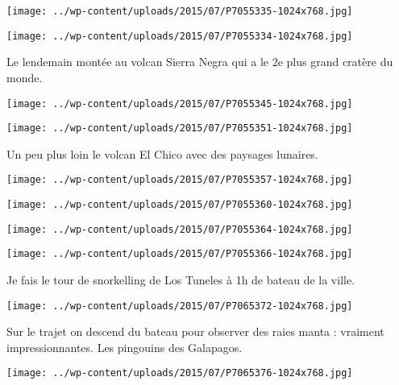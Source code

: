  \newline
 \newline
\centerline{\texttt{[image: ../wp-content/uploads/2015/07/P7055335-1024x768.jpg]} } 
 \newline
 \newline
\centerline{\texttt{[image: ../wp-content/uploads/2015/07/P7055334-1024x768.jpg]} } 
 \newline
 Le lendemain montée au volcan Sierra Negra qui a le 2e plus grand cratère du monde. \newline
 \newline
\centerline{\texttt{[image: ../wp-content/uploads/2015/07/P7055345-1024x768.jpg]} } 
 \newline
 \newline
\centerline{\texttt{[image: ../wp-content/uploads/2015/07/P7055351-1024x768.jpg]} } 
 \newline
 Un peu plus loin le volcan El Chico avec des paysages lunaires. \newline
 \newline
\centerline{\texttt{[image: ../wp-content/uploads/2015/07/P7055357-1024x768.jpg]} } 
 \newline
 \newline
\centerline{\texttt{[image: ../wp-content/uploads/2015/07/P7055360-1024x768.jpg]} } 
 \newline
 \newline
\centerline{\texttt{[image: ../wp-content/uploads/2015/07/P7055364-1024x768.jpg]} } 
 \newline
 \newline
\centerline{\texttt{[image: ../wp-content/uploads/2015/07/P7055366-1024x768.jpg]} } 
 \newline
 Je fais le tour de snorkelling de Los Tuneles à 1h de bateau de la ville. \newline
 \newline
\centerline{\texttt{[image: ../wp-content/uploads/2015/07/P7065372-1024x768.jpg]} } 
 \newline
 Sur le trajet on descend du bateau pour observer des raies manta : vraiment impressionnantes. \newline
 Les pingouins des Galapagos. \newline
 \newline
\centerline{\texttt{[image: ../wp-content/uploads/2015/07/P7065376-1024x768.jpg]} } 
